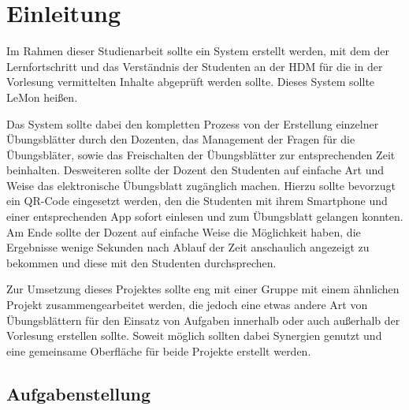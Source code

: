 \chapter{Einleitung}

Im Rahmen dieser Studienarbeit sollte ein System erstellt werden, mit dem der Lernfortschritt und
das Verständnis  der Studenten an der \gls{HDM} für die in der Vorlesung vermittelten Inhalte
abgeprüft werden sollte. Dieses System sollte \gls{LeMon} heißen.

Das System sollte dabei den kompletten Prozess von der Erstellung einzelner Übungsblätter durch den
Dozenten, das Management der Fragen für die Übungsbläter, sowie das Freischalten der Übungsblätter
zur entsprechenden Zeit beinhalten.
Desweiteren sollte der Dozent den Studenten auf einfache Art und Weise das elektronische Übungsblatt
zugänglich machen. Hierzu sollte bevorzugt ein QR-Code eingesetzt werden, den die Studenten mit
ihrem Smartphone und einer entsprechenden App sofort einlesen und zum Übungsblatt gelangen konnten.
\newline Am Ende sollte der Dozent auf einfache Weise die Möglichkeit haben, die Ergebnisse wenige
Sekunden nach Ablauf der Zeit anschaulich angezeigt zu bekommen und diese mit den Studenten
durchsprechen.

Zur Umsetzung dieses Projektes sollte eng mit einer Gruppe mit einem ähnlichen Projekt
zusammengearbeitet werden, die jedoch eine etwas andere Art von Übungsblättern für den Einsatz von
Aufgaben innerhalb oder auch außerhalb der Vorlesung erstellen sollte. Soweit möglich sollten dabei
Synergien genutzt und eine gemeinsame Oberfläche für beide Projekte erstellt werden.


\section{Aufgabenstellung}

 

% 
%  
% 
% 
% 

